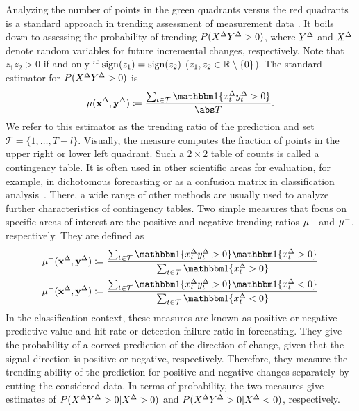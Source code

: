 Analyzing the number of points in the green quadrants versus the red quadrants is a standard approach in trending assessment of measurement data \parencite{Critchley2010,Saugel2015}. 
It boils down to assessing the probability of trending $P(X^{\Delta} Y^{\Delta} > 0)$, where $Y^{\Delta}$ and $X^{\Delta}$ denote random variables for future incremental changes, respectively.
Note that $z_1 z_2 > 0$ if and only if $\operatorname{sign}(z_1) = \operatorname{sign}(z_2)$ ($z_1, z_2 \in \mathbb{R} \setminus \{ 0 \}$).
The standard estimator for $P(X^{\Delta} Y^{\Delta} > 0)$ is
\begin{equation}
    \acc (\diffx, \diffy) \coloneqq \frac{\sum_{t \in \mathcal{T}} \ind{\diffxt \diffyt > 0}}{\card{T}}.\label{eq:acc}
\end{equation}
We refer to this estimator as the trending ratio of the prediction and set $\mathcal{T} = \{1, \dots, T-l\}$.
Visually, the measure computes the fraction of points in the upper right or lower left quadrant.
Such a $2 \times 2$ table of counts is called a contingency table.
It is often used in other scientific areas for evaluation, for example, in dichotomous forecasting or as a confusion matrix in classification analysis~\parencites(see, e.g., the introductions in)()[Ch. 4]{James2021}[Ch. 3]{Jolliffe2012}.
There, a wide range of other methods are usually used to analyze further characteristics of contingency tables.
Two simple measures that focus on specific areas of interest are the positive and negative trending ratios $\mu^+$ and $\mu^-$, respectively.
They are defined as
\begin{align}
    \accp (\diffx, \diffy) &\coloneqq \frac{\sum_{t \in \mathcal{T}} \ind{\diffxt \diffyt > 0} \ind{\diffxt > 0}}{\sum_{t \in \mathcal{T}} \ind{\diffxt > 0}} \label{eq:accp}\\
    \accm (\diffx, \diffy) &\coloneqq \frac{\sum_{t \in \mathcal{T}} \ind{\diffxt \diffyt > 0} \ind{\diffxt < 0}}{\sum_{t \in \mathcal{T}} \ind{\diffxt < 0}}\label{eq:accm}
\end{align}
In the classification context, these measures are known as positive or negative predictive value and hit rate or detection failure ratio in forecasting.
They give the probability of a correct prediction of the direction of change, given that the signal direction is positive or negative, respectively.
Therefore, they measure the trending ability of the prediction for positive and negative changes separately by cutting the considered data.
In terms of probability, the two measures give estimates of $P(X^{\Delta} Y^{\Delta} > 0 | X^{\Delta} > 0)$ and $P(X^{\Delta} Y^{\Delta} > 0 | X^{\Delta} < 0)$, respectively.

